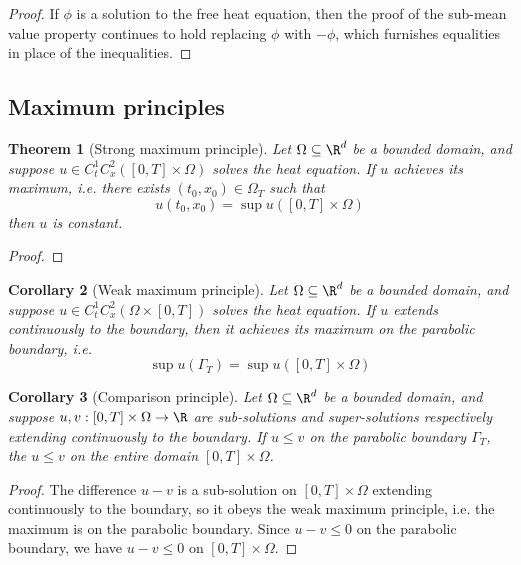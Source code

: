 \documentclass[reqno]{amsart}
\newtheorem{theorem}{Theorem}
\newtheorem{corollary}[theorem]{Corollary}
\theoremstyle{definition}
\theoremstyle{remark}
\begin{document}
\begin{proof}
	If $\phi$ is a solution to the free heat equation, then the proof of the sub-mean value property continues to hold replacing $\phi$ with $-\phi$, which furnishes equalities in place of the inequalities.
\end{proof}

\subsection{Maximum principles}

\begin{theorem}[Strong maximum principle]
	Let $\Omega \subseteq \R^d$ be a bounded domain, and suppose $u \in C^1_t C^2_x ([0, T] \times \Omega)$ solves the heat equation. If $u$ achieves its maximum, i.e. there exists $(t_0, x_0) \in \Omega_T$ such that 
		\[ u(t_0, x_0) = \sup u ([0, T] \times \Omega) \]
	then $u$ is constant. 	
\end{theorem}

\begin{proof}
	
\end{proof}

\begin{corollary}[Weak maximum principle]
	Let $\Omega \subseteq \R^d$ be a bounded domain, and suppose $u \in C^1_t C^2_x (\Omega \times [0, T])$ solves the heat equation. If $u$ extends continuously to the boundary, then it achieves its maximum on the parabolic boundary, i.e.
		\[ \sup u (\Gamma_T) = \sup u ([0, T] \times \Omega) \]
\end{corollary}

\begin{corollary}[Comparison principle]
	Let $\Omega \subseteq \R^d$ be a bounded domain, and suppose $u, v : [0,T] \times \Omega \to \R$ are sub-solutions and super-solutions respectively extending continuously to the boundary. If $u \leq v$ on the parabolic boundary $\Gamma_T$, the $u \leq v$ on the entire domain $[0, T] \times \Omega$. 
\end{corollary}

\begin{proof}
	The difference $u - v$ is a sub-solution on $[0, T] \times \Omega$ extending continuously to the boundary, so it obeys the weak maximum principle, i.e. the maximum is on the parabolic boundary. Since $u - v \leq 0$ on the parabolic boundary, we have $u - v \leq 0$ on $[0, T] \times \Omega$. 
\end{proof}
\end{document}
